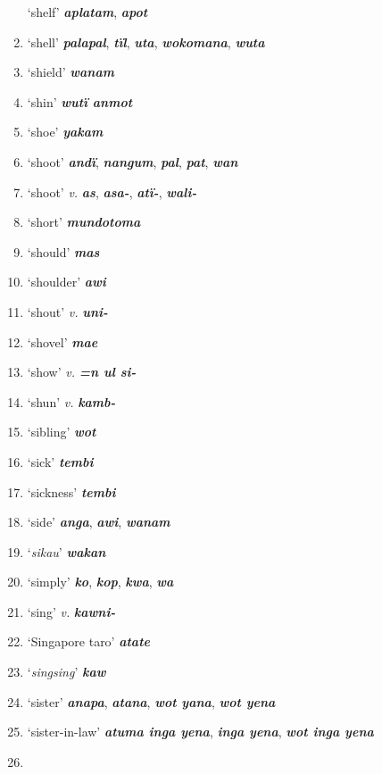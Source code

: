 \begin{enumerate}[noitemsep, label={}, align=left, widest=190, labelsep=1ex,leftmargin=*,itemindent=-10pt]
‘shelf’ \textbf{\textit{aplatam}}, \textbf{\textit{apot}} \item
‘shell’ \textbf{\textit{palapal}}, \textbf{\textit{tïl}}, \textbf{\textit{uta}}, \textbf{\textit{wokomana}}, \textbf{\textit{wuta}} \item
‘shield’ \textbf{\textit{wanam}} \item
‘shin’ \textbf{\textit{wutï anmot}} \item
‘shoe’ \textbf{\textit{yakam}} \item
‘shoot’ \textbf{\textit{andï}}, \textbf{\textit{nangum}}, \textbf{\textit{pal}}, \textbf{\textit{pat}}, \textbf{\textit{wan}} \item
‘shoot’ \textit{v.} \textbf{\textit{as}}, \textbf{\textit{asa-}}, \textbf{\textit{atï-}}, \textbf{\textit{wali-}} \item
‘short’ \textbf{\textit{mundotoma}} \item
‘should’ \textbf{\textit{mas}} \item
‘shoulder’ \textbf{\textit{awi}} \item
‘shout’ \textit{v.} \textbf{\textit{uni-}} \item
‘shovel’ \textbf{\textit{mae}} \item
‘show’ \textit{v.} \textbf{\textit{=n ul si-}} \item
‘shun’ \textit{v.} \textbf{\textit{kamb-}} \item
‘sibling’ \textbf{\textit{wot}} \item
‘sick’ \textbf{\textit{tembi}} \item
‘sickness’ \textbf{\textit{tembi}} \item
‘side’ \textbf{\textit{anga}}, \textbf{\textit{awi}}, \textbf{\textit{wanam}} \item
‘\textit{sikau}’ \textbf{\textit{wakan}} \item
‘simply’ \textbf{\textit{ko}}, \textbf{\textit{kop}}, \textbf{\textit{kwa}}, \textbf{\textit{wa}} \item
‘sing’ \textit{v.} \textbf{\textit{kawni-}} \item
‘Singapore taro’ \textbf{\textit{atate}} \item
‘\textit{singsing}’ \textbf{\textit{kaw}} \item
‘sister’ \textbf{\textit{anapa}}, \textbf{\textit{atana}}, \textbf{\textit{wot yana}}, \textbf{\textit{wot yena}} \item
‘sister-in-law’ \textbf{\textit{atuma inga yena}}, \textbf{\textit{inga yena}}, \textbf{\textit{wot inga yena}} \item

\end{enumerate}
